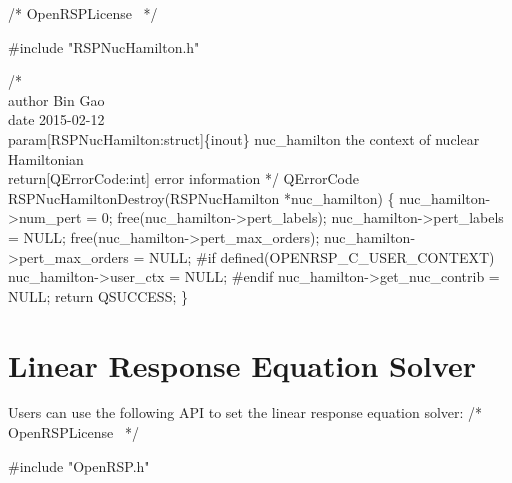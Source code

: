 \nwendcode{}\endmoddef
/*
  \LA{}OpenRSPLicense~{\nwtagstyle{}}\RA{}
*/

#include "RSPNucHamilton.h"

/*%
    \\author Bin Gao
    \\date 2015-02-12
    \\param[RSPNucHamilton:struct]\{inout\} nuc_hamilton the context of nuclear Hamiltonian
    \\return[QErrorCode:int] error information
*/
QErrorCode RSPNucHamiltonDestroy(RSPNucHamilton *nuc_hamilton)
\{
    nuc_hamilton->num_pert = 0;
    free(nuc_hamilton->pert_labels);
    nuc_hamilton->pert_labels = NULL;
    free(nuc_hamilton->pert_max_orders);
    nuc_hamilton->pert_max_orders = NULL;
#if defined(OPENRSP_C_USER_CONTEXT)
    nuc_hamilton->user_ctx = NULL;
#endif
    nuc_hamilton->get_nuc_contrib = NULL;
    return QSUCCESS;
\}

\nwendcode{}\section{Linear Response Equation Solver}
\label{section-OpenRSP-solver}

Users can use the following API to set the linear response equation solver:
\nwenddocs{}\endmoddef
/*
  \LA{}OpenRSPLicense~{\nwtagstyle{}}\RA{}
*/

#include "OpenRSP.h"


